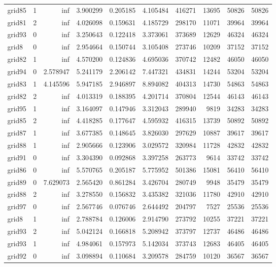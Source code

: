 \begin{longtable}{|l|r|r|r|r|r|r|r|r|r|}
grid85 & 1 & inf & 3.900299 & 0.205185 & 4.105484 & 416271 & 13695 & 50826 & 50826 \\
grid81 & 2 & inf & 4.026098 & 0.159631 & 4.185729 & 298170 & 11071 & 39964 & 39964 \\
grid93 & 0 & inf & 3.250643 & 0.122418 & 3.373061 & 373689 & 12629 & 46324 & 46324 \\
grid8 & 0 & inf & 2.954664 & 0.150744 & 3.105408 & 273746 & 10209 & 37152 & 37152 \\
grid82 & 1 & inf & 4.570200 & 0.124836 & 4.695036 & 370742 & 12482 & 46050 & 46050 \\
grid94 & 0 & 2.578947 & 5.241179 & 2.206142 & 7.447321 & 434831 & 14244 & 53204 & 53204 \\
grid83 & 1 & 4.145596 & 5.947185 & 2.946897 & 8.894082 & 404313 & 14730 & 54863 & 54863 \\
grid82 & 2 & inf & 4.013319 & 0.188395 & 4.201714 & 370804 & 12544 & 46143 & 46143 \\
grid95 & 1 & inf & 3.164097 & 0.147946 & 3.312043 & 289940 & 9819 & 34283 & 34283 \\
grid85 & 2 & inf & 4.418285 & 0.177647 & 4.595932 & 416315 & 13739 & 50892 & 50892 \\
grid87 & 1 & inf & 3.677385 & 0.148645 & 3.826030 & 297629 & 10887 & 39617 & 39617 \\
grid88 & 1 & inf & 2.905666 & 0.123906 & 3.029572 & 320984 & 11728 & 42832 & 42832 \\
grid91 & 0 & inf & 3.304390 & 0.092868 & 3.397258 & 263773 & 9614 & 33742 & 33742 \\
grid86 & 0 & inf & 5.570765 & 0.205187 & 5.775952 & 501386 & 15081 & 56410 & 56410 \\
grid89 & 0 & 7.629073 & 2.565420 & 0.861284 & 3.426704 & 280749 & 9948 & 35479 & 35479 \\
grid88 & 2 & inf & 3.278550 & 0.156832 & 3.435382 & 321036 & 11780 & 42910 & 42910 \\
grid97 & 0 & inf & 2.567746 & 0.076746 & 2.644492 & 204797 & 7527 & 25536 & 25536 \\
grid8 & 1 & inf & 2.788784 & 0.126006 & 2.914790 & 273792 & 10255 & 37221 & 37221 \\
grid93 & 2 & inf & 5.042124 & 0.166818 & 5.208942 & 373797 & 12737 & 46486 & 46486 \\
grid93 & 1 & inf & 4.984061 & 0.157973 & 5.142034 & 373743 & 12683 & 46405 & 46405 \\
grid92 & 0 & inf & 3.098894 & 0.110684 & 3.209578 & 284759 & 10120 & 36567 & 36567 \\

\end{longtable}
